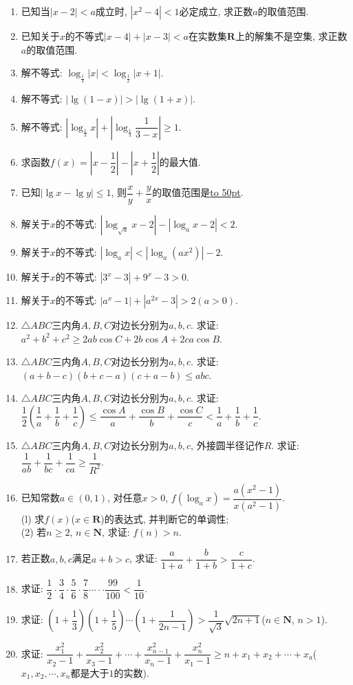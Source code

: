 \documentclass[10pt,a4paper]{article}
\newcommand{\blank}[1]{\underline{\hbox to #1pt{}}}
\begin{document}
\begin{enumerate}[1.]
\item 已知当$|x-2|<a$成立时, $|x^2-4|<1$必定成立, 求正数$a$的取值范围.
\item 已知关于$x$的不等式$|x-4|+|x-3|<a$在实数集$\mathbf{R}$上的解集不是空集, 求正数$a$的取值范围.
\item 解不等式: $\log_{\frac 14}|x|<\log_{\frac 12}|x+1|$.
\item 解不等式: $|\lg (1-x)|>|\lg (1+x)|$.
\item 解不等式: $|\log_{\frac 13}x|+|\log_{\frac 13}\dfrac 1{3-x}|\ge 1$.
\item 求函数$f(x)=|x-\dfrac 12|-|x+\dfrac 12|$的最大值.
\item 已知$|\lg x-\lg y|\le 1$, 则$\dfrac xy+\dfrac yx$的取值范围是\blank{50}.
\item 解关于$x$的不等式: $|\log_{\sqrt a}x-2|-|\log_ax-2|<2$.
\item 解关于$x$的不等式: $|\log_ax|<|\log_a(ax^2)|-2$.
\item 解关于$x$的不等式: $|3^x-3|+9^x-3>0$.	
\item 解关于$x$的不等式: $|a^x-1|+|a^{2x}-3|>2(a>0)$.
\item $\triangle ABC$三内角$A,B,C$对边长分别为$a,b,c$. 求证: $a^2+b^2+c^2\ge 2ab\cos C+2b\cos A+2ca\cos B$.
\item $\triangle ABC$三内角$A,B,C$对边长分别为$a,b,c$. 求证: $(a+b-c)(b+c-a)(c+a-b)\le abc$.
\item $\triangle ABC$三内角$A,B,C$对边长分别为$a,b,c$. 求证: $\dfrac 12(\dfrac 1a+\dfrac 1b+\dfrac 1c)\le \dfrac{\cos A}a+\dfrac{\cos B}b+\dfrac{\cos C}c<\dfrac 1a+\dfrac 1b+\dfrac 1c$.
\item $\triangle ABC$三内角$A,B,C$对边长分别为$a,b,c$, 外接圆半径记作$R$. 求证: $\dfrac 1{ab}+\dfrac 1{bc}+\dfrac 1{ca}\ge \dfrac 1{R^2}$.
\item 已知常数$a\in (0,1)$, 对任意$x>0$, $f(\log_ax)=\dfrac{a(x^2-1)}{x(a^2-1)}$.\\
(l) 求$f(x)$($x\in \mathbf{R}$)的表达式, 并判断它的单调性;\\
(2) 若$n\ge 2$, $n\in \mathbf{N}$, 求证: $f(n)>n$.
\item 若正数$a,b,c$满足$a+b>c$, 求证: $\dfrac a{1+a}+\dfrac b{1+b}>\dfrac c{1+c}$.
\item 求证: $\dfrac 12\cdot \dfrac 34\cdot \dfrac 56\cdot \dfrac 78\cdots \cdot \cdot \dfrac{99}{100}<\dfrac 1{10}$.
\item 求证: $(1+\dfrac 13)(1+\dfrac 15)\cdots (1+\dfrac 1{2n-1})>\dfrac 1{\sqrt 3}\sqrt{2n+1}$($n\in \mathbf{N}$, $n>1$).
\item 求证: $\dfrac{x_1^2}{x_2-1}+\dfrac{x_2^2}{x_3-1}+\cdots +\dfrac{x_{n-1}^2}{x_n-1}+\dfrac{x_n^2}{x_1-1}\ge n+x_1+x_2+\cdots +x_a$($x_1,x_2,\cdots,x_n$都是大于$1$的实数).

\end{enumerate}
\end{document}
